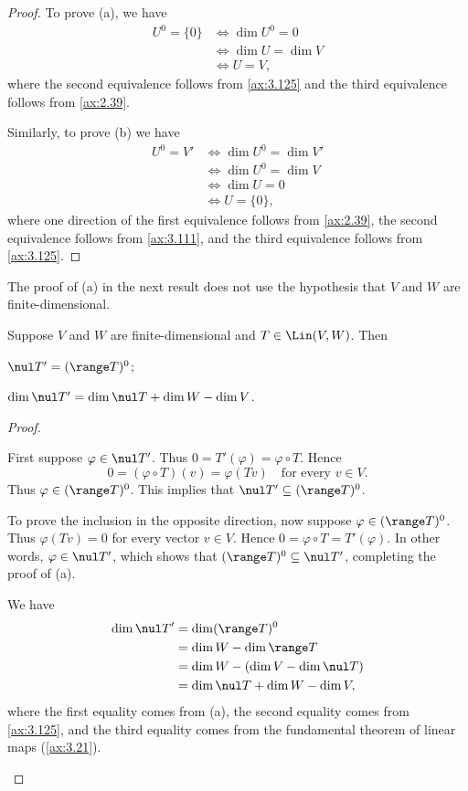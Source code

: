 \begin{proof}
To prove (a), we have
\begin{align*}
U^0=\{0\} &\iff \dim U^0=0\\
          &\iff \dim U=\dim V\\
          &\iff U=V,
\end{align*}
where the second equivalence follows from \ref{ax:3.125} and the third
equivalence follows from \ref{ax:2.39}.

Similarly, to prove (b) we have
\begin{align*}
U^0=V' &\iff \dim U^0=\dim V'\\
       &\iff \dim U^0=\dim V\\
       &\iff \dim U=0\\
       &\iff U=\{0\},
\end{align*}
where one direction of the first equivalence follows from \ref{ax:2.39}, the
second equivalence follows from \ref{ax:3.111}, and the third equivalence
follows from \ref{ax:3.125}.
\end{proof}

The proof of (a) in the next result does not use the hypothesis that $V$ and
$W$ are finite-dimensional.

\begin{result}\label{ax:3.128}
Suppose $V$ and $W$ are finite-dimensional and $T\in\Lin(V,W)$. Then
\begin{parts}
\item $\nul T'=(\range T)^0$;
\item $\dim\nul T'=\dim\nul T+\dim W-\dim V$.
\end{parts}
\end{result}

\begin{proof}\leavevmode
\begin{parts}
\item First suppose $\varphi\in\nul T'$. Thus $0=T'(\varphi)=\varphi\circ T$.
  Hence
  \[ 0 = (\varphi\circ T)(v) = \varphi(Tv) \quad\text{for every } v\in V. \]
  Thus $\varphi\in(\range T)^0$. This implies that
  $\nul T'\subseteq(\range T)^0$.

  To prove the inclusion in the opposite direction, now suppose
  $\varphi\in(\range T)^0$. Thus $\varphi(Tv)=0$ for every vector $v\in V$.
  Hence $0=\varphi\circ T=T'(\varphi)$. In other words, $\varphi\in\nul T'$,
  which shows that $(\range T)^0\subseteq\nul T'$, completing the proof of (a).
\item We have
  \begin{align*}
  \dim\nul T' &= \dim(\range T)^0\\
              &= \dim W-\dim\range T\\
              &= \dim W-(\dim V-\dim\nul T)\\
              &= \dim\nul T+\dim W-\dim V,
  \end{align*}
  where the first equality comes from (a), the second equality comes from
  \ref{ax:3.125}, and the third equality comes from the fundamental theorem of
  linear maps (\ref{ax:3.21}). \qedhere
\end{parts}
\end{proof}

